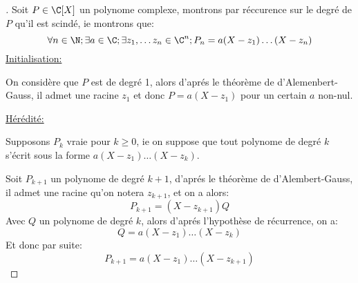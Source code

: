 \documentclass{report}
\begin{document}
   \subsection*{}   

   \subsection*{}
   \begin{proof}[\unskip\nopunct]
      Soit \(P \in \C[X]\) un polynome complexe, montrons par réccurence sur le degré de \(P\) qu'il est scindé, ie montrons que:
      \[
         \forall n \in \N ; \exists a  \in \C ; \exists z_1, \ldots z_n \in \C^n; P_n = a(X-z_1)\ldots (X-z_n)
      \]
      \underline{Initialisation:} 
      
      On considère que \(P\) est de degré 1, alors d'aprés le théorème de d'Alemenbert-Gauss, il admet une racine \(z_1\) et donc \(P = a(X-z_1)\) pour un certain \(a\) non-nul.\<

      \underline{Hérédité:} 
      
      Supposons \(P_k\) vraie pour \(k \geq 0\), ie on suppose que tout polynome de degré \(k\) s'écrit sous la forme \(a(X-z_1)\ldots(X-z_k)\).\<

      Soit \(P_{k+1}\) un polynome de degré \(k+1\), d'aprés le théorème de d'Alembert-Gauss, il admet une racine qu'on notera \(z_{k+1}\), et on a alors:
      \[
         P_{k+1} = (X - z_{k+1})Q
      \]
      Avec \(Q\) un polynome de degré \(k\), alors d'aprés l'hypothèse de récurrence, on a:
      \[
         Q = a(X-z_1)\ldots(X-z_k) 
      \]
      Et donc par suite:
      \[
         P_{k+1} = a(X-z_1)\ldots(X-z_{k+1}) 
      \]
   \end{proof}
\end{document}
